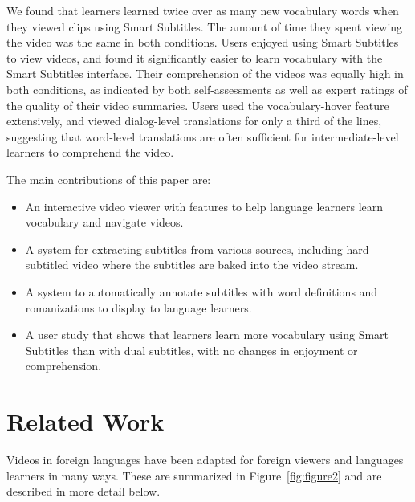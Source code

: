 \documentclass{sigchi}
\begin{document}
We found that learners learned twice over as many new vocabulary
words when they viewed clips using Smart Subtitles.
The amount of time they spent viewing the video was the same in both conditions.
Users enjoyed
using Smart Subtitles to view videos, and found it
significantly easier to learn vocabulary with the Smart Subtitles interface.
Their comprehension of the videos was equally high in both conditions,
as indicated by both self-assessments as well as expert ratings
of the quality of their video summaries.
Users used the vocabulary-hover feature extensively,
and viewed dialog-level translations for only a third of the lines,
suggesting that word-level translations
are often sufficient for intermediate-level learners to comprehend the video.

The main contributions of this paper are:

\begin{itemize}[noitemsep]
\item An interactive video viewer with features to help language learners
learn vocabulary and navigate videos.
\item A system for extracting subtitles from various sources, including
hard-subtitled video where the subtitles are baked into the video stream.
\item A system to automatically annotate subtitles with word definitions
and romanizations to display to language learners.
\item A user study that shows that learners learn more vocabulary using Smart Subtitles than with dual subtitles, with no changes in enjoyment or comprehension.
\end{itemize}




\section{Related Work}

Videos in foreign languages have been adapted for foreign viewers and languages learners in many ways. These are summarized in Figure~\ref{fig:figure2} and are described in more detail below.
\end{document}
